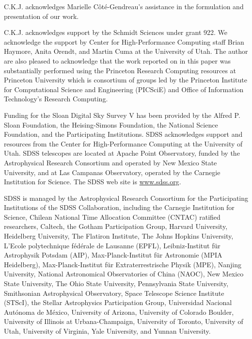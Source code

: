 \documentclass[twocolumn,astrosymb,tighten,twocolappendix,longbib,trackchanges]{aastex7} %
\begin{document}
\begin{acknowledgments}
C.K.J. acknowledges Marielle Côté-Gendreau's assistance in the formulation and presentation of our work. 

C.K.J. acknowledges support by the Schmidt Sciences under grant 922.
We acknowledge the support by Center for High-Performance Computing staff Brian Haymore, Anita Orendt, and Martin Cuma at the University of Utah. The author are also pleased to acknowledge that the work reported on in this paper was substantially performed using the Princeton Research Computing resources at Princeton University which is consortium of groups led by the Princeton Institute for Computational Science and Engineering (PICSciE) and Office of Information Technology's Research Computing.

Funding for the Sloan Digital Sky Survey V has been provided by the Alfred P. Sloan Foundation, the Heising-Simons Foundation, the National Science Foundation, and the Participating Institutions. SDSS acknowledges support and resources from the Center for High-Performance Computing at the University of Utah. SDSS telescopes are located at Apache Point Observatory, funded by the Astrophysical Research Consortium and operated by New Mexico State University, and at Las Campanas Observatory, operated by the Carnegie Institution for Science. The SDSS web site is \url{www.sdss.org}.

SDSS is managed by the Astrophysical Research Consortium for the Participating Institutions of the SDSS Collaboration, including the Carnegie Institution for Science, Chilean National Time Allocation Committee (CNTAC) ratified researchers, Caltech, the Gotham Participation Group, Harvard University, Heidelberg University, The Flatiron Institute, The Johns Hopkins University, L'Ecole polytechnique f\'{e}d\'{e}rale de Lausanne (EPFL), Leibniz-Institut f\"{u}r Astrophysik Potsdam (AIP), Max-Planck-Institut f\"{u}r Astronomie (MPIA Heidelberg), Max-Planck-Institut f\"{u}r Extraterrestrische Physik (MPE), Nanjing University, National Astronomical Observatories of China (NAOC), New Mexico State University, The Ohio State University, Pennsylvania State University, Smithsonian Astrophysical Observatory, Space Telescope Science Institute (STScI), the Stellar Astrophysics Participation Group, Universidad Nacional Aut\'{o}noma de M\'{e}xico, University of Arizona, University of Colorado Boulder, University of Illinois at Urbana-Champaign, University of Toronto, University of Utah, University of Virginia, Yale University, and Yunnan University.

\end{acknowledgments}
\end{document}
